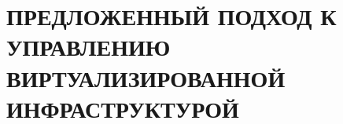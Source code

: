 \section[ПРЕДЛОЖЕННЫЙ ПОДХОД К УПРАВЛЕНИЮ \\ ВИРТУАЛИЗИРОВАННОЙ ИНФРАСТРУКТУРОЙ]{ПРЕДЛОЖЕННЫЙ ПОДХОД К УПРАВЛЕНИЮ \\ ВИРТУАЛИЗИРОВАННОЙ \\ ИНФРАСТРУКТУРОЙ}
 \FloatBarrier
 \FloatBarrier